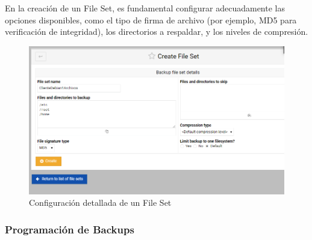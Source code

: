 \smallskip






\begin{minipage}[t]{0.45\textwidth}
    \vspace{0pt} %
    En la creación de un File Set, es fundamental configurar adecuadamente las opciones disponibles, como el tipo de firma de archivo (por ejemplo, MD5 para verificación de integridad), los directorios a respaldar, y los niveles de compresión.
   

    \end{minipage}%
    \hfill %
    \begin{minipage}[t]{0.45\textwidth}
    \vspace{0pt} %
    \centering %
      
    
\begin{figure}[H]
    \centering
    \includegraphics[width=0.95\linewidth]{instalacionBacula/createrfilesett.png}
    \caption{Configuración detallada de un File Set}
\end{figure}
    \end{minipage}


\smallskip














\subsubsection{Programación de Backups}






